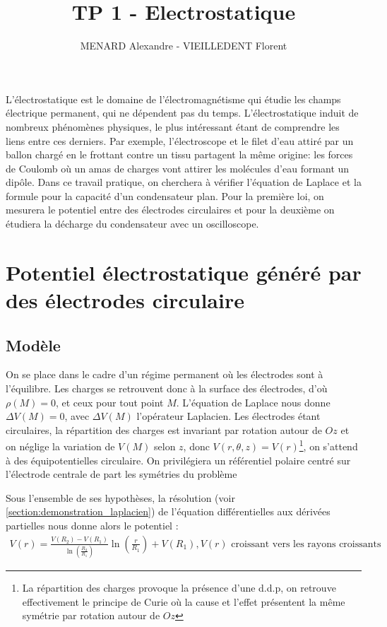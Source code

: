 \documentclass[12pt]{article}
\title{\textbf{TP 1 - Electrostatique}}
\author{MENARD Alexandre - VIEILLEDENT Florent}
\date{}
\begin{document}
\maketitle

L'électrostatique est le domaine de l'électromagnétisme qui étudie les champs électrique permanent, qui ne dépendent pas du temps. L'électrostatique induit de nombreux phénomènes physiques,
le plus intéressant étant de comprendre les liens entre ces derniers. Par exemple, l'électroscope et le filet d'eau attiré par un ballon chargé en le frottant contre un tissu partagent la même origine: les forces de Coulomb où un amas de charges vont attirer les molécules d'eau formant un dipôle.
Dans ce travail pratique, on cherchera à vérifier l'équation de Laplace et la formule pour la capacité d'un condensateur plan. 
Pour la première loi, on mesurera le potentiel entre des électrodes circulaires et pour la deuxième on étudiera la décharge du condensateur avec un oscilloscope.

\section{Potentiel électrostatique généré par des électrodes circulaire}
	\subsection{Modèle}
	\label{section:laplacien}
	On se place dans le cadre d'un régime permanent où les électrodes sont à l'équilibre. Les charges se retrouvent donc à la surface des électrodes, d'où $\rho(M) = 0$, et ceux pour tout point $M$.
	L'équation de Laplace nous donne $\Delta V(M) = 0$, avec $\Delta V(M)$ l'opérateur Laplacien. 
	Les électrodes étant circulaires, la répartition des charges est invariant par rotation autour de $Oz$ et on néglige la variation de $V(M)$ selon $z$, donc $V(r,\theta, z)=V(r)$\footnote{La répartition des charges provoque la présence d'une d.d.p, on retrouve effectivement le principe de Curie où la cause et l'effet présentent la même symétrie par rotation autour de $Oz$}, on s'attend à des équipotentielles circulaire.
	On privilégiera un référentiel polaire centré sur l'électrode centrale de part les symétries du problème
	
	Sous l'ensemble de ses hypothèses, la résolution (voir \ref{section:demonstration_laplacien}) de l'équation différentielles aux dérivées partielles nous donne alors le potentiel :
	\begin{align*}
		V(r) = \frac{V(R_2) - V(R_1)}{\ln(\frac{R_2}{R_1})} \ln\left(\frac{r}{R_1}\right) + V(R_1), V(r) \text{ croissant vers les rayons croissants}
	\end{align*}
\end{document}
